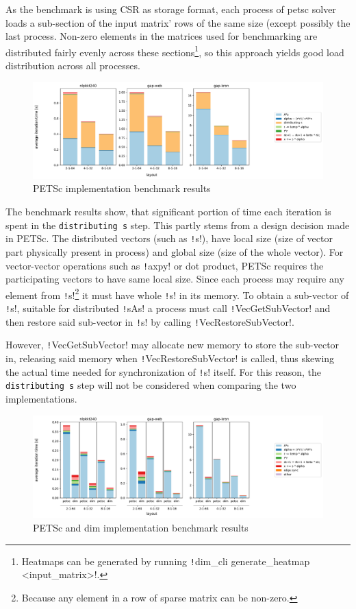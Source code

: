 \documentclass[thesis=M,english]{FITthesis}[2019/12/23]
\newcommand{\csre}[1]{\texttt!#1!}
\begin{document}
As the benchmark is using CSR as storage format,
each process of petsc solver loads a sub-section of the input matrix' rows of the same size (except possibly the last
process. Non-zero elements in the matrices used for benchmarking are distributed fairly
evenly across these sections\footnote{Heatmaps can be generated by running  \csre{dim_cli generate_heatmap <input_matrix>}.},
so this approach yields good load distribution across all processes.

\begin{figure}[htp]
    \centering
    \includegraphics[scale=0.35]{static/petsc_mpi.pdf}
    \caption{PETSc implementation benchmark results}
\end{figure}

The benchmark results show, that significant portion of time each iteration is spent in the \texttt{distributing s}
step. This partly stems from a design decision made in PETSc. The distributed vectors (such as \csre{s}),
have local size (size of vector part physically present in process) and global size (size of the whole vector).
For vector-vector operations such as \csre{axpy} or dot product, PETSc requires the participating vectors to
have same local size. Since each process may require any element from
\csre{s}\footnote{Because any element in a row of sparse matrix can be non-zero.} it must have whole \csre{s}
in its memory. To obtain a sub-vector of \csre{s}, suitable for distributed \csre{sAs} a process must call
\csre{VecGetSubVector} and then restore said sub-vector in \csre{s} by calling \csre{VecRestoreSubVector}.

However, \csre{VecGetSubVector} may allocate new memory to store the sub-vector in, releasing said memory
when \csre{VecRestoreSubVector} is called, thus skewing the actual time needed for synchronization of
\csre{s} itself. For this reason, the \texttt{distributing s} step will not be considered when comparing
the two implementations.

\begin{figure}[htp]
    \centering
    \includegraphics[scale=0.35]{static/petsc_vs_dim.pdf}
    \caption{PETSc and dim implementation benchmark results}
\end{figure}
\end{document}
